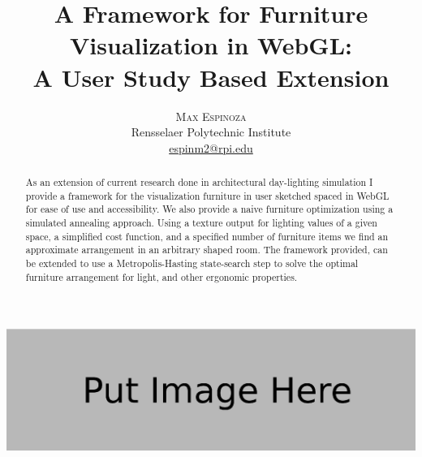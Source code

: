 \documentclass[twoside]{article}
\title{\vspace{-15mm}\fontsize{18pt}{10pt}\selectfont\textbf{A Framework for Furniture Visualization in WebGL:\\ A User Study Based Extension}} %
\author{
\large
\textsc{Max Espinoza}\\[2mm] %
\normalsize Rensselaer Polytechnic Institute \\ %
\normalsize \href{mailto:espinm2@rpi.edu}{espinm2@rpi.edu} %
\vspace{-5mm}
}
\date{}
\begin{document}
\maketitle %

\thispagestyle{fancy} %




\begin{abstract}

\noindent As an extension of current research done in architectural day-lighting
simulation I provide a framework for the visualization furniture in user sketched
spaced in WebGL for ease of use and accessibility. We also provide a naive furniture
optimization using a simulated annealing approach. Using a texture output for lighting 
values of a given space, a simplified cost function, and a specified number of furniture
items we find an approximate arrangement in an arbitrary shaped room. The framework provided,
can be extended to use a Metropolis-Hasting state-search step to solve the optimal furniture 
arrangement for light, and other ergonomic properties.

\end{abstract}

\includegraphics[width=45em]{images/placeholder_wide.eps}
\end{document}
